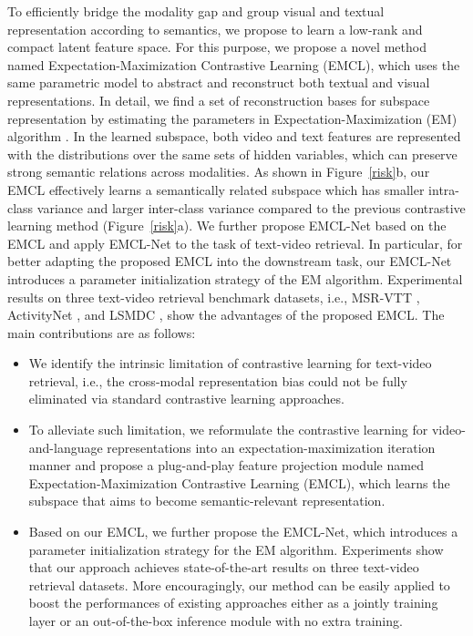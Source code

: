 \documentclass{article}
\begin{document}
To efficiently bridge the modality gap and group visual and textual representation according to semantics, we propose to learn a low-rank and compact latent feature space. For this purpose, we propose a novel method named Expectation-Maximization Contrastive Learning (EMCL), which uses the same parametric model to abstract and reconstruct both textual and visual representations. In detail, we find a set of reconstruction bases for subspace representation by estimating the parameters in Expectation-Maximization (EM) algorithm \cite{dempster1977maximum}. In the learned subspace, both video and text features are represented with the distributions over the same sets of hidden variables, which can preserve strong semantic relations across modalities. As shown in Figure~\ref{risk}b, our EMCL effectively learns a semantically related subspace which has smaller intra-class variance and larger inter-class variance compared to the previous contrastive learning method (Figure~\ref{risk}a). We further propose EMCL-Net based on the EMCL and apply EMCL-Net to the task of text-video retrieval. In particular, for better adapting the proposed EMCL into the downstream task, our EMCL-Net introduces a parameter initialization strategy of the EM algorithm. Experimental results on three text-video retrieval benchmark datasets, i.e., MSR-VTT \cite{xu2016msr}, ActivityNet \cite{krishna2017dense}, and LSMDC \cite{rohrbach2015a}, show the advantages of the proposed EMCL. The main contributions are as follows:
\vspace{-5pt}
\begin{itemize}
    \item We identify the intrinsic limitation of contrastive learning for text-video retrieval, i.e., the cross-modal representation bias could not be fully eliminated via standard contrastive learning approaches.

    \item To alleviate such limitation, we reformulate the contrastive learning for video-and-language representations into an expectation-maximization iteration manner and propose a plug-and-play feature projection module named Expectation-Maximization Contrastive Learning (EMCL), which learns the subspace that aims to become semantic-relevant representation.

    \item Based on our EMCL, we further propose the EMCL-Net, which introduces a parameter initialization strategy for the EM algorithm. Experiments show that our approach achieves state-of-the-art results on three text-video retrieval datasets. More encouragingly, our method can be easily applied to boost the performances of existing approaches either as a jointly training layer or an out-of-the-box inference module with no extra training.
\end{itemize}
\end{document}
